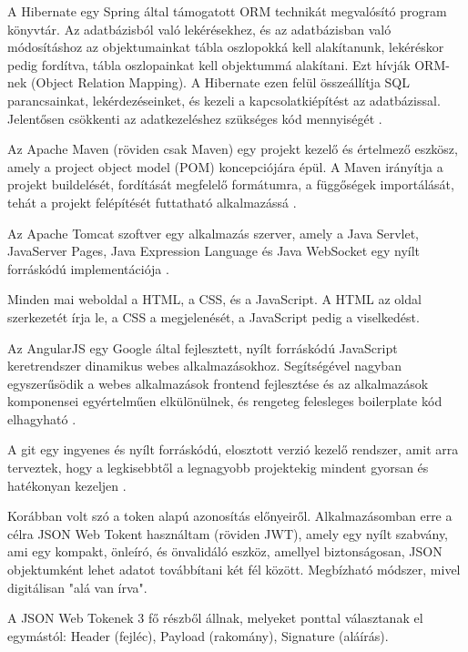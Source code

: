 A Hibernate egy Spring által támogatott ORM technikát megvalósító program könyvtár. Az adatbázisból való lekérésekhez, és az adatbázisban való módosításhoz az objektumainkat tábla oszlopokká kell alakítanunk, lekéréskor pedig fordítva, tábla oszlopainkat kell objektummá alakítani. Ezt hívják ORM-nek (Object Relation Mapping). A Hibernate ezen felül összeállítja SQL parancsainkat, lekérdezéseinket, és kezeli a kapcsolatkiépítést az adatbázissal. Jelentősen csökkenti az adatkezeléshez szükséges kód mennyiségét \cite{spring}.

Az Apache Maven (röviden csak Maven) egy projekt kezelő és értelmező eszkösz, amely a project object model (POM) koncepciójára épül. A Maven irányítja a projekt buildelését, fordítását megfelelő formátumra, a függőségek importálását, tehát a projekt felépítését futtatható alkalmazássá \cite{maven}.

Az Apache Tomcat szoftver egy alkalmazás szerver, amely a Java Servlet, JavaServer Pages, Java Expression Language és Java WebSocket egy nyílt forráskódú implementációja \cite{tomcat}.

Minden mai weboldal a HTML, a CSS, és a JavaScript. A HTML az oldal szerkezetét írja le, a CSS a megjelenését, a JavaScript pedig a viselkedést.

Az AngularJS egy Google által fejlesztett, nyílt forráskódú JavaScript keretrendszer dinamikus webes alkalmazásokhoz. Segítségével nagyban egyszerűsödik a webes alkalmazások frontend fejlesztése és az alkalmazások komponensei egyértelműen elkülönülnek, és rengeteg felesleges boilerplate kód elhagyható \cite{angularjs}.

A git egy ingyenes és nyílt forráskódú, elosztott verzió kezelő rendszer, amit arra terveztek, hogy a legkisebbtől a legnagyobb projektekig mindent gyorsan és hatékonyan kezeljen \cite{git}.


Korábban volt szó a token alapú azonosítás előnyeiről. Alkalmazásomban erre a célra JSON Web Tokent használtam (röviden JWT), amely egy nyílt szabvány, ami egy kompakt, önleíró, és önvalidáló eszköz, amellyel biztonságosan, JSON objektumként lehet adatot továbbítani két fél között. Megbízható módszer, mivel digitálisan "alá van írva".

A JSON Web Tokenek 3 fő részből állnak, melyeket ponttal választanak el egymástól: Header (fejléc), Payload (rakomány), Signature (aláírás).

